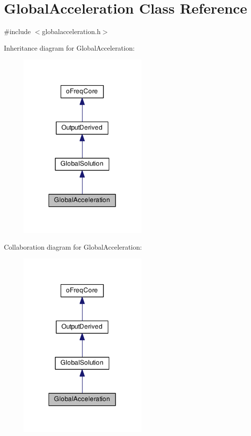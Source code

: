 \hypertarget{class_global_acceleration}{\section{Global\-Acceleration Class Reference}
\label{class_global_acceleration}
}


{\ttfamily \#include $<$globalacceleration.\-h$>$}



Inheritance diagram for Global\-Acceleration\-:
\nopagebreak
\begin{figure}[H]
\begin{center}
\leavevmode
\includegraphics[width=182pt]{class_global_acceleration__inherit__graph}
\end{center}
\end{figure}


Collaboration diagram for Global\-Acceleration\-:
\nopagebreak
\begin{figure}[H]
\begin{center}
\leavevmode
\includegraphics[width=182pt]{class_global_acceleration__coll__graph}
\end{center}
\end{figure}
